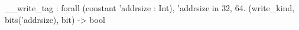__write_tag : forall (constant 'addrsize : Int), 'addrsize in {32, 64}. (write_kind, bits('addrsize), bit) -> bool